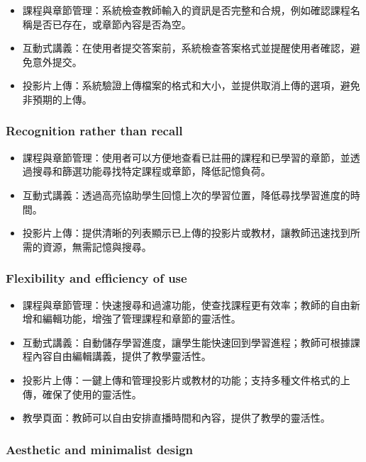 \documentclass[12pt]{article}
\begin{document}
\begin{itemize}
  \item 課程與章節管理：系統檢查教師輸入的資訊是否完整和合規，例如確認課程名稱是否已存在，或章節內容是否為空。
  \item 互動式講義：在使用者提交答案前，系統檢查答案格式並提醒使用者確認，避免意外提交。
  \item 投影片上傳：系統驗證上傳檔案的格式和大小，並提供取消上傳的選項，避免非預期的上傳。
\end{itemize}

\subsubsection{Recognition rather than recall}

\begin{itemize}
  \item 課程與章節管理：使用者可以方便地查看已註冊的課程和已學習的章節，並透過搜尋和篩選功能尋找特定課程或章節，降低記憶負荷。
  \item 互動式講義：透過高亮協助學生回憶上次的學習位置，降低尋找學習進度的時間。
  \item 投影片上傳：提供清晰的列表顯示已上傳的投影片或教材，讓教師迅速找到所需的資源，無需記憶與搜尋。
\end{itemize}

\subsubsection{Flexibility and efficiency of use}

\begin{itemize}
  \item 課程與章節管理：快速搜尋和過濾功能，使查找課程更有效率；教師的自由新增和編輯功能，增強了管理課程和章節的靈活性。
  \item 互動式講義：自動儲存學習進度，讓學生能快速回到學習進程；教師可根據課程內容自由編輯講義，提供了教學靈活性。
  \item 投影片上傳：一鍵上傳和管理投影片或教材的功能；支持多種文件格式的上傳，確保了使用的靈活性。
  \item 教學頁面：教師可以自由安排直播時間和內容，提供了教學的靈活性。
\end{itemize}

\subsubsection{Aesthetic and minimalist design}
\end{document}
